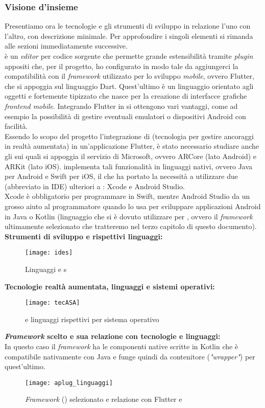 \subsubsection{Visione d'insieme}
Presentiamo ora le tecnologie e gli strumenti di sviluppo in relazione l'uno con l'altro, con descrizione minimale. Per approfondire i singoli elementi si rimanda alle sezioni immediatamente successive.\\
\vsc{} è un \textit{editor} per codice sorgente che permette grande estensibilità tramite \textit{plugin} appositi che, per il progetto, ho configurato in modo tale da aggiungerci la compatibilità con il \textit{framework} utilizzato per lo sviluppo \textit{mobile}, ovvero Flutter, che si appoggia sul linguaggio Dart. Quest'ultimo è un linguaggio orientato agli oggetti e fortemente tipizzato che nasce per la creazione di interfacce grafiche \textit{frontend mobile}. Integrando Flutter in \vsc{} si ottengono vari vantaggi, come ad esempio la possibilità di gestire eventuali emulatori o dispositivi Android con facilità.\\
Essendo lo scopo del progetto l'integrazione di \asa{} (tecnologia per gestire ancoraggi in realtà aumentata) in un'applicazione Flutter, è stato necessario studiare anche gli \sdk{} sui quali si appoggia il servizio di Microsoft, ovvero ARCore (lato Android) e ARKit (lato iOS). \asa{} implementa tali funzionalità in linguaggi nativi, ovvero Java per Android e Swift per iOS, il che ha portato la necessità a utilizzare due \ide{}(abbreviato in IDE) ulteriori a \vsc{}: Xcode e Android Studio.\\
Xcode è obbligatorio per programmare in Swift, mentre Android Studio da un grosso aiuto al programmatore quando lo usa per sviluppare applicazioni Android in Java o Kotlin (linguaggio che si è dovuto utilizzare per \aplug{}, ovvero il \textit{framework} ultimamente selezionato che tratteremo nel terzo capitolo di questo documento).\\
\textbf{Strumenti di sviluppo e rispettivi linguaggi:}
\begin{figure}[ht]
    \centering
    \texttt{[image: ides]}
    \caption{Linguaggi e \ide{}s}
\end{figure}\aCapo{}
\textbf{Tecnologie realtà aumentata, linguaggi e sistemi operativi:}
\begin{figure}[ht]
    \centering
    \texttt{[image: tecASA]}
    \caption{\asa{} e linguaggi rispettivi per sistema operativo}
\end{figure}\aCapo{}
\textbf{\textit{Framework} scelto e sua relazione con tecnologie e linguaggi:}\\
In questo caso il \textit{framework} ha le componenti native scritte in Kotlin che è compatibile nativamente con Java e funge quindi da contenitore (\textit{"wrapper"}) per quest'ultimo.\\
\begin{figure}[ht]
    \centering
    \texttt{[image: aplug\_linguaggi]}
    \caption{\textit{Framework} (\aplug) selezionato e relazione con Flutter e \asa{}}
\end{figure}

